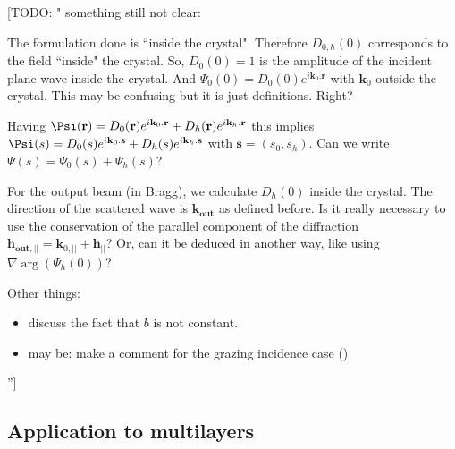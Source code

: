 \documentclass[preprint]{iucr}              %
\newcommand{\todo}[1]{{\color{red}[TODO: "#1'']}}
\newcommand{\inred}[1]{{\color{red}#1}}
\begin{document}
\todo{ something still not clear:

The formulation done is ``inside the crystal". Therefore $D_{0,h}(0)$ corresponds to the field ``inside" the crystal. So, $D_0(0)=1$ is the amplitude of the incident plane wave inside the crystal. 
And $\Psi_0(0)=D_0(0) e^{i \textbf{k}_0. \textbf{r}}$ with $\textbf{k}_0$ outside the crystal. This may be confusing but it is just definitions.  
Right? 

Having $\Psi(\textbf r) = D_0(\textbf r) e^{i \textbf k_0 . \textbf r} + D_h(\textbf r) e^{i \textbf k_h . \textbf r}$ this implies $\Psi(s) = D_0(s) e^{i \textbf k_0 . \textbf{s}} + D_h(s) e^{i \textbf k_h . \textbf s}$ with $\textbf{s}=(s_0,s_h)$. Can we write $\Psi(s)=\Psi_0(s)+\Psi_h(s)$?


For the output beam (in Bragg), we calculate $D_h(0)$ inside the crystal. The direction of the scattered wave is $\textbf{k}_{\textbf{out}}$ as defined before. 
Is it really necessary to use the conservation of the parallel component of the diffraction $\textbf{h}_{\textbf{out},||}= \textbf{k}_{0,||} + \textbf{h}_{||}$? Or, can it be deduced in another way, like using  $\nabla  \arg(\Psi_h(0))$? 

Other things: 
\begin{itemize}
    \item discuss the fact that $b$ is not constant.
    \item may be: make a comment for the grazing incidence case (\cite{Yashiro2001, Stepanov1998})
\end{itemize}
}

\inred{
\subsection{Application to multilayers}
}\label{sec:multilayers}
\end{document}
